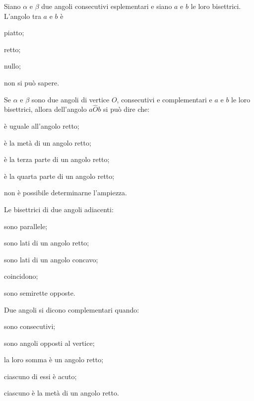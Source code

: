 \begin{esercizio}
\label{ese:1.67}
Siano $\alpha$ e $\beta$ due angoli consecutivi esplementari e siano 
$a$ e $b$ le loro bisettrici. L'angolo tra $a$ e $b$ è
\begin{multicols}{2}
\begin{enumeratea}
\item piatto;
\item retto;
\item nullo;
\item non si può sapere.
\end{enumeratea}
\end{multicols}
\end{esercizio}

\begin{esercizio}
\label{ese:1.68}
Se $\alpha$ e $\beta$ sono due angoli di vertice $O$, consecutivi e 
complementari e $a$ e $b$ le loro bisettrici, allora dell'angolo 
$a\widehat{O}b$ si può dire  che:
\begin{multicols}{2}
\begin{enumeratea}
\item è uguale all'angolo retto;
\item è la metà di un angolo retto;
\item è la terza parte di un angolo retto;
\item è la quarta parte di un angolo retto;
\item non è possibile determinarne l'ampiezza.
\end{enumeratea}
\end{multicols}
\end{esercizio}

\begin{esercizio}
\label{ese:1.69}
Le bisettrici di due angoli adiacenti:
\begin{multicols}{2}
\begin{enumeratea}
\item sono parallele;
\item sono lati di un angolo retto;
\item sono lati di un angolo concavo;
\item coincidono;
\item sono semirette opposte.
\end{enumeratea}
\end{multicols}
\end{esercizio}

\begin{esercizio}
\label{ese:1.70}
Due angoli si dicono complementari quando:
\begin{multicols}{2}
\begin{enumeratea}
\item sono consecutivi;
\item sono angoli opposti al vertice;
\item la loro somma è un angolo retto;
\item ciascuno di essi è acuto;
\item ciascuno è la metà di un angolo retto.
\end{enumeratea}
\end{multicols}
\end{esercizio}

